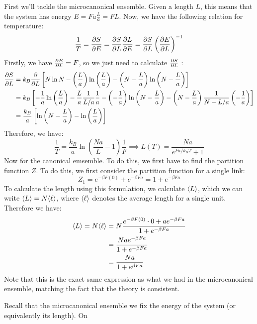 \documentclass[10pt]{article}
\begin{document}
\begin{enumerate}[label=\alph*)]
			\begin{solution}
				First we'll tackle the microcanonical ensemble. Given a length \(L\), this means that the 
				system has energy \(E = Fa \frac{L}{a} = FL\). Now, we have the following relation for 
				temperature:
				\[
					\frac{1}{T} = \pdv{S}{E} = \pdv{S}{L} \pdv{L}{E} = \pdv{S}{L} \left( \pdv{E}{L} \right)^{-1}
				\] 
				Firstly, we have \(\pdv{E}{L} = F\), so we just need to calculate \(\pdv{S}{L}\) :
				\begin{align*}
					\pdv{S}{L} &= k_B \pdv{L} \left[ N \ln N - \left( \frac{L}{a} \right) \ln \left( \frac{L}{a} \right) - \left( N - \frac{L}{a} \right) \ln \left( N - \frac{L}{a} \right)  \right]  \\
					&= k_B \left[ -\frac{1}{a}\ln \left( \frac{L}{a} \right) - \frac{L}{a}\frac{1}{L / a} \frac{1}{a} - \left( -\frac{1}{a} \right) \ln \left( N - \frac{L}{a} \right) - \left( N - \frac{L}{a} \right) 
					\frac{1}{N - L / a} \left( -\frac{1}{a} \right) \right]  \\
					&= \frac{k_B}{a}\left[ \ln \left( N - \frac{L}{a} \right) - \ln \left( \frac{L}{a} \right)  \right]  
				\end{align*}
				Therefore, we have:
				\[
				\frac{1}{T} = \frac{k_B}{a}\ln \left( \frac{Na}{L} - 1 \right) \frac{1}{F} \implies 
				L(T) = \frac{Na}{e^{Fa / k_BT} + 1}
				\] 
				Now for the canonical emsemble. To do this, we first have to find the partition function 
				\(Z\). To do this, we first consider the partition function for a single 
				link:
				\[
					Z_1 = e^{-\beta F(0)} + e^{-\beta F a} = 1 + e^{-\beta Fa}
				\] 
				To calculate the length using this formulation, we calculate \(\langle L \rangle\), which we can 
				write \(\langle L \rangle = N \langle \ell \rangle\), where \(\langle \ell \rangle\) denotes the average length 
				for a single unit. Therefore we have:
				\begin{align*}
					\langle L \rangle = N \langle \ell \rangle &= N \frac{e^{-\beta F(0)} \cdot 0 + ae^{- \beta F a}}{1 + e^{-\beta Fa}}\\
										   &= \frac{Nae^{- \beta Fa}}{1 + e^{- \beta Fa}} \\
										   &= \frac{Na}{1 + e^{\beta Fa}} 
				\end{align*}
				Note that this is the exact same expression as what we had in the microcanonical 
				ensemble, matching the fact that the theory is consistent. 
			\end{solution}
	\end{enumerate}
	Recall that the microcanonical ensemble we fix the energy of the system (or equivalently its length). On 
\end{document}
